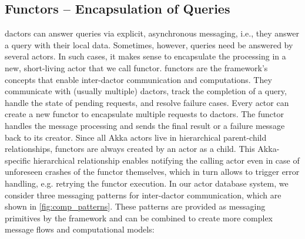   \subsection{Functors -- Encapsulation of Queries}
    \Glspl{dactor} can answer queries via explicit, asynchronous messaging, {i.e.}, they answer a query with their local data.
    Sometimes, however, queries need be answered by several actors.
    In such cases, it makes sense to encapsulate the processing in a new, short-living actor that we call \gls{functor}.
    \Glspl{functor} are the framework's concepts that enable inter-\gls{dactor} communication and computations.
    They communicate with (usually multiple) \glspl{dactor}, track the completion of a query, handle the state of pending requests, and resolve failure cases.
    Every actor can create a new \gls{functor} to encapsulate multiple requests to \glspl{dactor}.
    The \gls{functor} handles the message processing and sends the final result or a failure message back to its creator.
    Since all Akka actors live in hierarchical parent-child relationships, \glspl{functor} are always created by an actor as a child.
    This Akka-specific hierarchical relationship enables notifying the calling actor even in case of unforeseen crashes of the \gls{functor} themselves, which in turn allows to trigger error handling, e.g. retrying the \gls{functor} execution.
    In our actor database system, we consider three messaging patterns for inter-\gls{dactor} communication, which are shown in \cref{fig:comp_patterns}.
    These patterns are provided as messaging primitives by the framework and can be combined to create more complex message flows and computational models:

